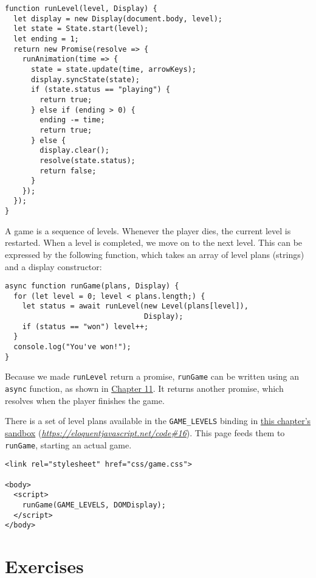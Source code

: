 \begin{lstlisting}
function runLevel(level, Display) {
  let display = new Display(document.body, level);
  let state = State.start(level);
  let ending = 1;
  return new Promise(resolve => {
    runAnimation(time => {
      state = state.update(time, arrowKeys);
      display.syncState(state);
      if (state.status == "playing") {
        return true;
      } else if (ending > 0) {
        ending -= time;
        return true;
      } else {
        display.clear();
        resolve(state.status);
        return false;
      }
    });
  });
}
\end{lstlisting}
\noindent{}

A game is a sequence of levels. Whenever the player dies, the current level is restarted. When a level is completed, we move on to the next level. This can be expressed by the following function, which takes an array of level plans (strings) and a display constructor:

\begin{lstlisting}
async function runGame(plans, Display) {
  for (let level = 0; level < plans.length;) {
    let status = await runLevel(new Level(plans[level]),
                                Display);
    if (status == "won") level++;
  }
  console.log("You've won!");
}
\end{lstlisting}
\noindent{}

Because we made \lstinline`runLevel` return a promise, \lstinline`runGame` can be written using an \lstinline`async` function, as shown in \hyperref[async]{Chapter 11}. It returns another promise, which resolves when the player finishes the game.

There is a set of level plans available in the \lstinline`GAME_LEVELS` binding in \href{https://eloquentjavascript.net/code#16}{this chapter's sandbox} (\href{https://eloquentjavascript.net/code#16}{\emph{https://eloquentjavascript.net\slash code\#16}}). This page feeds them to \lstinline`runGame`, starting an actual game.

\begin{lstlisting}
<link rel="stylesheet" href="css/game.css">

<body>
  <script>
    runGame(GAME_LEVELS, DOMDisplay);
  </script>
</body>
\end{lstlisting}
\noindent

\section{Exercises}

